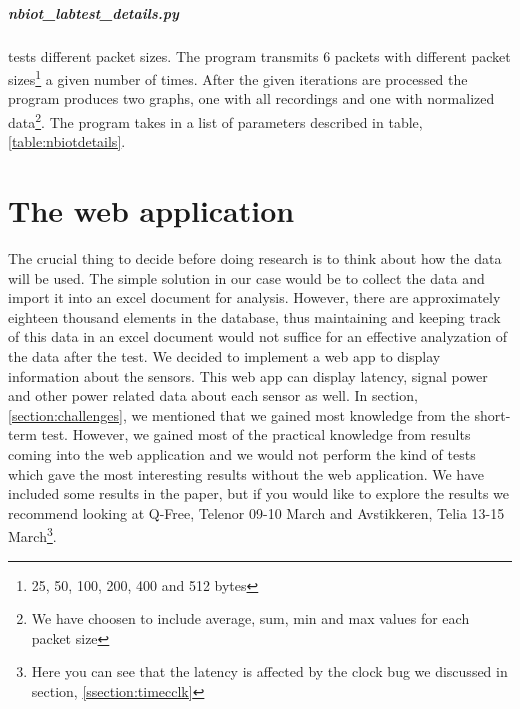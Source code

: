 \documentclass[USenglish]{ifimaster}  %
\begin{document}
\paragraph{\textbf{nbiot\_labtest\_details.py}} tests different packet sizes. The program transmits 6 packets with different packet sizes\footnote{25, 50, 100, 200, 400 and 512 bytes} a given number of times. After the given iterations are processed the program produces two graphs, one with all recordings and one with normalized data\footnote{We have choosen to include average, sum, min and max values for each packet size}. The program takes in a list of parameters described in table, \vref{table:nbiotdetails}.

\begin{table}[H]
\centering
{}
\caption[\textbf{nbiot\_labtest\_details.py} parameters]{\textbf{nbiot\_labtest\_details.py} parameters. See \href{https://github.com/henninghaakonsen/thesis/blob/master/code/nbiot_labtest_details.py}{\acrshort{nb-iot} details}\cite{code:nbiotdetails} for complete code}
\label{table:nbiotdetails}
\end{table}

\chapter{The web application} \label{chapter:webapp}
The crucial thing to decide before doing research is to think about how the data will be used. The simple solution in our case would be to collect the data and import it into an excel document for analysis. However, there are approximately eighteen thousand elements in the database, thus maintaining and keeping track of this data in an excel document would not suffice for an effective analyzation of the data after the test. We decided to implement a web app to display information about the sensors. This web app can display latency, signal power and other power related data about each sensor as well. In section, \vref{section:challenges}, we mentioned that we gained most knowledge from the short-term test. However, we gained most of the practical knowledge from results coming into the web application and we would not perform the kind of tests which gave the most interesting results without the web application. We have included some results in the paper, but if you would like to explore the results we recommend looking at Q-Free, Telenor 09-10 March and Avstikkeren, Telia 13-15 March\footnote{Here you can see that the latency is affected by the clock bug we discussed in section, \vref{ssection:timecclk}}.
\end{document}
